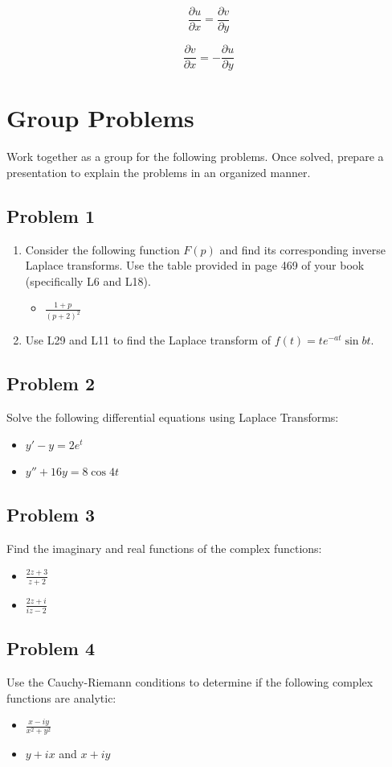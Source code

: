 \documentclass{article}
\begin{document}
\begin{itemize}
  \begin{equation}
      \frac{\partial u}{\partial x}=\frac{\partial v}{\partial y}
  \end{equation}
  
  \begin{equation}
      \frac{\partial v}{\partial x}=-\frac{\partial u}{\partial y}
  \end{equation}
 \end{itemize}
 
  \section{Group Problems}
  Work together as a group for the following problems. Once solved, prepare a presentation to explain the problems in an organized manner.
  \subsection{Problem 1}
  \begin{enumerate}[label=(\alph*)]
\item Consider the following function $F(p)$ and find its corresponding inverse Laplace transforms. Use the table provided in page 469 of your book (specifically L6 and L18).
  
  \begin{itemize}
      \item $\frac{1+p}{(p+2)^2}$
  \end{itemize}
  
  \item
  Use L29 and L11 to find the Laplace transform of $f(t)=te^{-at}\sin{bt}$.
  \end{enumerate}
  \subsection{Problem 2}
  Solve the following differential equations using Laplace Transforms:
  
  \begin{itemize}
      \item $y'-y=2e^{t}$
      \item $y''+16y=8\cos{4t}$
  \end{itemize}
 
  \subsection{Problem 3}
  Find the imaginary and real functions of the complex functions:
  \begin{itemize}
      \item$\frac{2z+3}{z+2}$ 
      \item $\frac{2z+i}{iz-2}$
      \end{itemize}
  \subsection{Problem 4}
  Use the Cauchy-Riemann conditions to determine if the following complex functions are analytic:
  \begin{itemize}
      \item $\frac{x-iy}{x^2+y^2}$
      \item $y+ix$ and $x+iy$
  \end{itemize}
  
\end{document}
